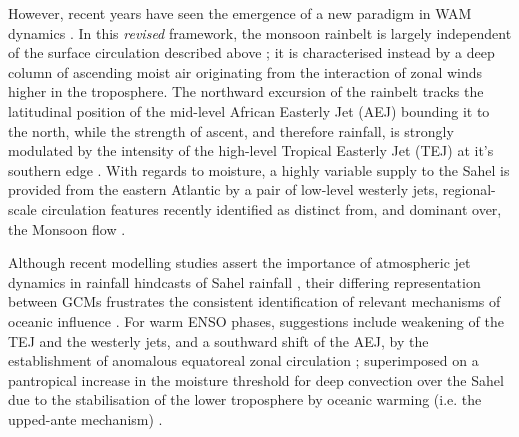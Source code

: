 \documentclass[a4paper]{article}
\begin{document}
However, recent years have seen the emergence of a new paradigm in WAM dynamics \parencite[see][for a comprehensive overview]{nicholson2009revised}.
In this \emph{revised} framework, the monsoon rainbelt is largely independent of the surface circulation described above \parencite{grist2001study}; it is characterised instead by a deep column of ascending moist air originating from the interaction of zonal winds higher in the troposphere.
The northward excursion of the rainbelt tracks the latitudinal position of the mid-level African Easterly Jet (AEJ) bounding it to the north, while the strength of ascent, and therefore rainfall, is strongly modulated by the intensity of the high-level Tropical Easterly Jet (TEJ) at it's southern edge \parencite{gu2004seasonal, nicholson2009revised, nicholson2013west}.
With regards to moisture, a highly variable supply to the Sahel is provided from the eastern Atlantic by a pair of low-level westerly jets, regional-scale circulation features recently identified as distinct from, and dominant over, the Monsoon flow \parencite{grodsky2003near, pu2010dynamics, nicholson2013west}.

Although recent modelling studies assert the importance of atmospheric jet dynamics in rainfall hindcasts of Sahel rainfall \parencite{philippon2010skill, xue2010intercomparison, ruti2011west, diallo2013interannual, tseng2016diagnosing}, their differing representation between GCMs frustrates the consistent identification of relevant mechanisms of oceanic influence \parencite{caminade2010twentieth, druyan2011studies}.
For warm ENSO phases, suggestions include weakening of the TEJ and the westerly jets, and a southward shift of the AEJ, by the establishment of anomalous equatoreal zonal circulation \parencite{joly2009influence, okonkwo2015combined, villamayor2015robust, preethi2015impacts}; superimposed on a pantropical increase in the moisture threshold for deep convection over the Sahel due to the stabilisation of the lower troposphere by oceanic warming (i.e. the upped-ante mechanism) \parencite{neelin2003tropical, caminade2010twentieth, liu2014atmospheric}. 

\end{document}
